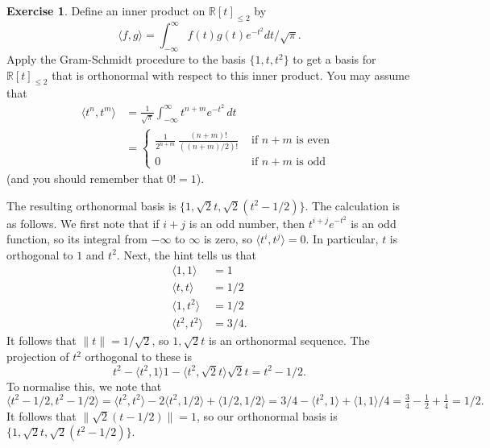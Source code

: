\documentclass{amsart}
\newcommand{\R}         {{\mathbb{R}}}
\newcommand{\ip}[1]     {\langle #1\rangle}
\renewcommand{\:}       {\colon}
\theoremstyle{definition}
\newtheorem{exercise}{Exercise}[section]
\renewenvironment{solution}{\SolutionAtEnd}{\endSolutionAtEnd}
\begin{document}
\begin{exercise}
 Define an inner product on $\R[t]_{\leq 2}$ by 
 \[ \ip{f,g} =
     \int_{-\infty}^\infty f(t)g(t)e^{-t^2}dt/\sqrt{\pi}.
 \]
 Apply the Gram-Schmidt procedure to the basis $\{1,t,t^2\}$
 to get a basis for $\R[t]_{\leq 2}$ that is orthonormal
 with respect to this inner product.  You may assume that
 \begin{align*}
  \ip{t^n,t^m} &= 
    \frac{1}{\sqrt{\pi}} \int_{-\infty}^\infty t^{n+m} e^{-t^2}\,dt \\
   &= 
    \begin{cases}
     \frac{1}{2^{n+m}} \,\frac{(n+m)!}{((n+m)/2)!} &
      \text{ if $n+m$ is even } \\
     0 & \text{ if $n+m$ is odd }
    \end{cases}
 \end{align*}
 (and you should remember that $0!=1$).  
\end{exercise}
\begin{solution}
 The resulting orthonormal basis is 
 $\{1,\sqrt{2}t,\sqrt{2}(t^2-1/2)\}$.  The calculation is as
 follows.  We first note that if $i+j$ is an odd number, then
 $t^{i+j}e^{-t^2}$ is an odd function, so its integral from
 $-\infty$ to $\infty$ is zero, so $\ip{t^i,t^j}=0$.  In
 particular, $t$ is orthogonal to $1$ and $t^2$.  Next,
 the hint tells us that
 \begin{align*}
  \ip{1,1} &= 1 \\
  \ip{t,t} &= 1/2 \\
  \ip{1,t^2} &= 1/2 \\
  \ip{t^2,t^2} &= 3/4.
 \end{align*}
 It follows that $\|t\|=1/\sqrt{2}$, so $1,\sqrt{2}t$ is an
 orthonormal sequence.  The projection of $t^2$ orthogonal
 to these is
 \[
  t^2 - \ip{t^2,1}1 - \ip{t^2,\sqrt{2}t} \sqrt{2}t 
   = t^2 - 1/2.
 \]
 To normalise this, we note that
 \[ \ip{t^2-1/2,t^2-1/2} = 
     \ip{t^2,t^2} - 2\ip{t^2,1/2} + \ip{1/2,1/2} = 
     3/4 - \ip{t^2,1} + \ip{1,1}/4 = 
     \tfrac{3}{4} - \tfrac{1}{2} + \tfrac{1}{4} = 1/2.
 \]
 It follows that $\|\sqrt{2}(t-1/2)\|=1$, so our orthonormal
 basis is $\{1,\sqrt{2}t,\sqrt{2}(t^2-1/2)\}$.
\end{solution}
\end{document}
